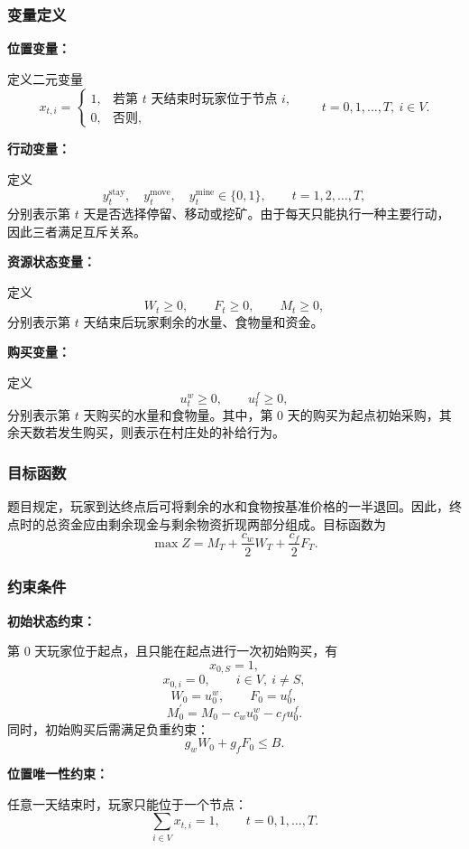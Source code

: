 \documentclass[UTF8,a4paper,12pt]{ctexart}
\begin{document}
\subsubsection{变量定义}

\noindent\textbf{位置变量：}

定义二元变量
\[
x_{t,i}=
\begin{cases}
1, & \text{若第 } t \text{ 天结束时玩家位于节点 } i,\\
0, & \text{否则},
\end{cases}
\qquad t=0,1,\dots,T,\ i\in V.
\]

\noindent\textbf{行动变量：}

定义
\[
y_t^{\mathrm{stay}},\quad y_t^{\mathrm{move}},\quad y_t^{\mathrm{mine}}\in\{0,1\},
\qquad t=1,2,\dots,T,
\]
分别表示第 $t$ 天是否选择停留、移动或挖矿。由于每天只能执行一种主要行动，因此三者满足互斥关系。

\noindent\textbf{资源状态变量：}

定义
\[
W_t \ge 0,\qquad F_t \ge 0,\qquad M_t \ge 0,
\]
分别表示第 $t$ 天结束后玩家剩余的水量、食物量和资金。

\noindent\textbf{购买变量：}

定义
\[
u_t^w\ge 0,\qquad u_t^f\ge 0,
\]
分别表示第 $t$ 天购买的水量和食物量。其中，第 $0$ 天的购买为起点初始采购，其余天数若发生购买，则表示在村庄处的补给行为。

\subsubsection{目标函数}

题目规定，玩家到达终点后可将剩余的水和食物按基准价格的一半退回。因此，终点时的总资金应由剩余现金与剩余物资折现两部分组成。目标函数为
\[
\max Z=M_T+\frac{c_w}{2}W_T+\frac{c_f}{2}F_T.
\]

\subsubsection{约束条件}

\noindent\textbf{初始状态约束：}

第 $0$ 天玩家位于起点，且只能在起点进行一次初始购买，有
\[
x_{0,S}=1,
\]
\[
x_{0,i}=0,\qquad i\in V,\ i\neq S,
\]
\[
W_0=u_0^w,\qquad F_0=u_0^f,
\]
\[
M_0^{\prime}=M_0-c_wu_0^w-c_fu_0^f.
\]
同时，初始购买后需满足负重约束：
\[
g_wW_0+g_fF_0\le B.
\]

\noindent\textbf{位置唯一性约束：}

任意一天结束时，玩家只能位于一个节点：
\[
\sum_{i\in V}x_{t,i}=1,\qquad t=0,1,\dots,T.
\]
\end{document}
